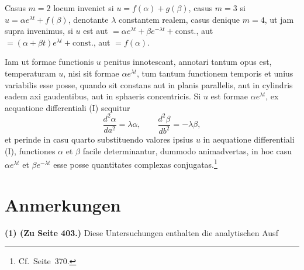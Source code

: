 \documentclass[12pt,a4paper]{article}
\begin{document}
Casus $m=2$ locum inveniet si $u = f(\alpha) + g(\beta)$, casus $m=3$
si $u = \alpha e^{\lambda t} + f(\beta)$, denotante $\lambda$ constantem realem,
casus denique $m=4$, ut jam supra invenimus, si $u$ est aut
$= \alpha e^{\lambda t} + \beta e^{-\lambda t} + \text{const.}$,
aut $= (\alpha + \beta t)e^{\lambda t} + \text{const.}$,
aut $= f(\alpha)$.

Iam ut formae functionis $u$ penitus innotescant, annotari tantum
opus est, temperaturam $u$, nisi sit formae $\alpha e^{\lambda t}$, tum tantum
 functionem temporis et unius variabilis esse posse, quando sit constans
aut in planis parallelis, aut in cylindris eadem axi gaudentibus, aut
in sphaeris concentricis. Si $u$ est formae $\alpha e^{\lambda t}$, ex aequatione
differentiali (I) sequitur
\[
\frac{d^2 \alpha}{da^2} = \lambda\alpha, \qquad
\frac{d^2 \beta}{db^2} = -\lambda\beta,
\]
et perinde in casu quarto substituendo valores ipsius $u$ in aequatione
differentiali (I), functiones $\alpha$ et $\beta$ facile determinantur, dummodo
animadvertas, in hoc casu $\alpha e^{\lambda t}$ et $\beta e^{-\lambda t}$ esse posse
 quantitates complexas conjugatas.\footnote{Cf.\ Seite~370.}

\newpage
\section*{Anmerkungen}

\textbf{(1) (Zu Seite 403.)} Diese Untersuchungen enthalten die analytischen Ausf\
\end{document}
